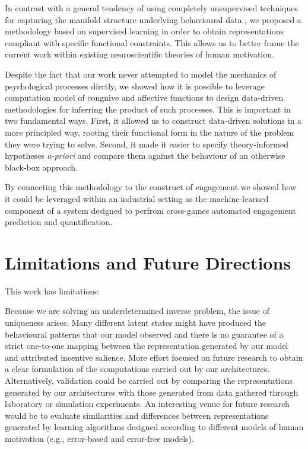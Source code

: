 In contrast with a general tendency of using completely unsupervised techniques for capturing the manifold structure underlying behavioural data \cite{calhoun2019unsupervised, luxem2020identifying, pereira2020quantifying, shi2021learning, mccullough2021unsupervised}, we proposed a methodology based on supervised learning in order to obtain representations compliant with specific functional constraints. This allows us to better frame the current work within existing neuroscientific theories of human motivation. 

Despite the fact that our work never attempted to model the mechanics of psychological processes dirctly, we showed how it is possible to leverage computation model of congnive and affective functions to design data-driven methodologies for inferring the product of such processes. This is important in two fundamental ways. First, it allowed us to construct data-driven solutions in a more principled way, rooting their functional form in the nature of the problem they were trying to solve. Second, it made it easier to specify theory-informed hypotheses \textit{a-priori} and compare them against the behaviour of an otherwise black-box approach.

By connecting this methodology to the construct of engagement we showed how it could be leveraged within an industrial setting as the machine-learned component of a system designed to perfrom cross-games automated engagement prediction and quantification.

\section{Limitations and Future Directions}
\label{discussion_limitations}
This work has limitations:

Because we are solving an underdetermined inverse problem, the issue of uniqueness arises. Many different latent states might have produced the behavioural patterns that our model observed and there is no guarantee of a strict one-to-one mapping between the representation generated by our model and attributed incentive salience.  More effort focused on future research to obtain a clear formulation of the computations carried out by our architectures. Alternatively, validation could be carried out by comparing the representations generated by our architectures with those generated from data gathered through laboratory or simulation experiments. An interesting venue for future research would be to evaluate similarities and differences between representations generated by learning algorithms designed according to different models of human motivation (e.g., error-based \cite{schultz1997neural} and error-free \cite{friston2012active} models).

